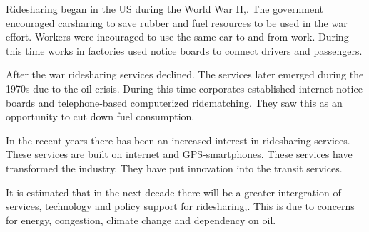 Ridesharing began in the US during the World War II,\citet{ferguson1997}. The government encouraged carsharing to save rubber and fuel resources to be used in the war effort. Workers were incouraged to use the same car to and from work. During this time works in factories used notice boards to connect drivers and passengers.

After the war ridesharing services declined. The services later emerged during the 1970s due to the oil crisis. During this time corporates established internet notice boards and telephone-based computerized ridematching. They saw this as an opportunity to cut down fuel consumption.

In the recent years there has been an increased interest in ridesharing services. These services are built on internet and GPS-smartphones. These services have transformed the industry. They have put innovation into the transit services.

It is estimated that in the next decade there will be a greater intergration of services, technology and policy support for ridesharing,\citet{chan2012}. This is due to concerns for energy, congestion, climate change and dependency on oil.